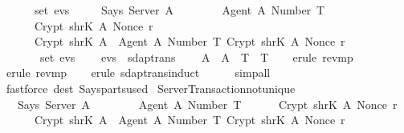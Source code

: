 \begin{isabellebody}
  \ \ \ \ {\isasymrbrace}\ {\isasymin}\ set\ evs\ {\isacharsemicolon}\isanewline
  \ \ \ \ Says\ Server\ A{\isacharprime}\ {\isasymlbrace}\ \isanewline
  \ \ \ \ \ \ {\isasymlbrace}Agent\ A{\isacharprime}{\isacharcomma}\ Number\ T{\isacharprime}{\isasymrbrace}{\isacharcomma}\isanewline
  \ \ \ \ \ \ Crypt\ {\isacharparenleft}shrK\ A{\isacharprime}{\isacharparenright}\ {\isacharparenleft}Nonce\ r{\isacharparenright}{\isacharcomma}\isanewline
  \ \ \ \ \ \ Crypt\ {\isacharparenleft}shrK\ A{\isacharprime}{\isacharparenright}\ {\isasymlbrace}\ {\isasymlbrace}Agent\ A{\isacharprime}{\isacharcomma}\ Number\ T{\isacharprime}{\isasymrbrace}{\isacharcomma}\ Crypt\ {\isacharparenleft}shrK\ A{\isacharprime}{\isacharparenright}\ {\isacharparenleft}Nonce\ r{\isacharparenright}\ {\isasymrbrace}\isanewline
  \ \ \ \ \ {\isasymrbrace}\ {\isasymin}\ set\ evs{\isacharsemicolon}\isanewline
  \ \ \ \ evs\ {\isasymin}\ sdaptrans{\isasymrbrakk}\isanewline
  \ \ \ {\isasymLongrightarrow}\ A\ {\isacharequal}\ A{\isacharprime}\ {\isasymand}\ T\ {\isacharequal}\ T{\isacharprime}{\isachardoublequoteclose}\isanewline
  \isadelimproof
  \isanewline
  \ \ %
  \endisadelimproof
  \isatagproof
  \isamarkupfalse%
  \ {\isacharparenleft}erule\ rev{\isacharunderscore}mp{\isacharparenright}\isanewline
  \ \ \isamarkupfalse%
  \ {\isacharparenleft}erule\ rev{\isacharunderscore}mp{\isacharparenright}\isanewline
  \ \ \isamarkupfalse%
  \ {\isacharparenleft}erule\ sdaptrans{\isachardot}induct{\isacharparenright}\ \ \isanewline
  \ \ \isamarkupfalse%
  \ {\isacharparenleft}simp{\isacharunderscore}all{\isacharparenright}\isanewline
  \ \ \isamarkupfalse%
  \ {\isacharparenleft}fastforce\ dest{\isacharcolon}\ Says{\isacharunderscore}parts{\isacharunderscore}used{\isacharparenright}\isanewline
  \isamarkupfalse%
  \endisatagproof
  {\isafoldproof}%
  \isadelimproof
  \isanewline
  \endisadelimproof
  \isanewline
  \isamarkupfalse%
  \ Server{\isacharunderscore}Transaction{\isacharunderscore}not{\isacharunderscore}unique\ {\isacharcolon}\ \isanewline
  \ \ {\isachardoublequoteopen}{\isasymlbrakk}\ Says\ Server\ A\ {\isasymlbrace}\ \isanewline
  \ \ \ \ \ \ {\isasymlbrace}Agent\ A{\isacharcomma}\ Number\ T{\isasymrbrace}{\isacharcomma}\isanewline
  \ \ \ \ \ \ Crypt\ {\isacharparenleft}shrK\ A{\isacharparenright}\ {\isacharparenleft}Nonce\ r{\isacharparenright}{\isacharcomma}\isanewline
  \ \ \ \ \ \ Crypt\ {\isacharparenleft}shrK\ A{\isacharparenright}\ {\isasymlbrace}\ {\isasymlbrace}Agent\ A{\isacharcomma}\ Number\ T{\isasymrbrace}{\isacharcomma}\ Crypt\ {\isacharparenleft}shrK\ A{\isacharparenright}\ {\isacharparenleft}Nonce\ r{\isacharparenright}\ {\isasymrbrace}\isanewline

\end{isabellebody}
